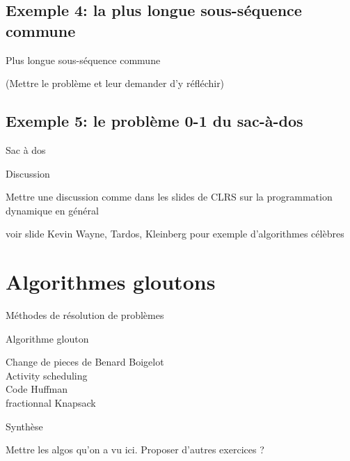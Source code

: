 \subsection{Exemple 4: la plus longue sous-séquence commune}

\begin{frame}{Plus longue sous-séquence commune}

(Mettre le problème et leur demander d'y réfléchir)

\end{frame}

\subsection{Exemple 5: le problème 0-1 du sac-à-dos}

\begin{frame}{Sac à dos}

\end{frame}

\begin{frame}{Discussion}

Mettre une discussion comme dans les slides de CLRS sur la
programmation dynamique en général

voir slide Kevin Wayne, Tardos, Kleinberg pour exemple d'algorithmes célèbres

\end{frame}

\section{Algorithmes gloutons}

\begin{frame}{Méthodes de résolution de problèmes}

\end{frame}

\begin{frame}{Algorithme glouton}

Change de pieces de Benard Boigelot\\

Activity scheduling\\

Code Huffman\\

fractionnal Knapsack

\end{frame}

\begin{frame}{Synthèse}

Mettre les algos qu'on a vu ici. Proposer d'autres exercices ?

\end{frame}
